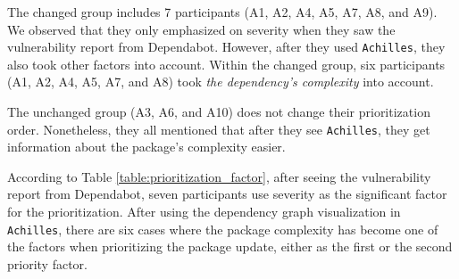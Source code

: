 \documentclass[conference]{IEEEtran}
\begin{document}
	The changed group includes 7 participants (A1, A2, A4, A5, A7, A8, and A9). We observed that they only emphasized on severity when they saw the vulnerability report from Dependabot. However, after they used \texttt{Achilles}, they also took other factors into account. Within the changed group, six participants (A1, A2, A4, A5, A7, and A8) took \textit{the dependency's complexity} into account. 
	
	The unchanged group (A3, A6, and A10) does not change their prioritization order. Nonetheless, they all mentioned that after they see \texttt{Achilles}, they get information about the package's complexity easier.
	
	According to Table \ref{table:prioritization_factor}, after seeing the vulnerability report from Dependabot, seven participants use severity as the significant factor for the prioritization. After using the dependency graph visualization in \texttt{Achilles}, there are six cases where the package complexity has become one of the factors when prioritizing the package update, either as the first or the second priority factor.
	
\end{document}
